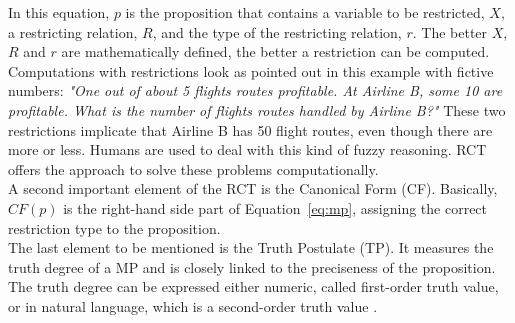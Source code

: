 \documentclass[conference]{IEEEtran}
\begin{document}
In this equation, \begin{math} p \end{math} is the proposition that contains a variable to be restricted, \begin{math} X \end{math}, a restricting relation, \begin{math} R \end{math}, and the type of the restricting relation, \begin{math} r \end{math}. The better \begin{math} X \end{math}, \begin{math} R \end{math} and \begin{math} r \end{math} are mathematically defined, the better a restriction can be computed. Computations with restrictions look as pointed out in this example with fictive numbers:\emph{ "One out of about 5 flights routes profitable. At Airline B, some 10 are profitable. What is the number of flights routes handled by Airline B?"} These two restrictions implicate that Airline B has 50 flight routes, even though there are more or less. Humans are used to deal with this kind of fuzzy reasoning. RCT offers the approach to solve these problems computationally.\\
A second important element of the RCT is the Canonical Form (CF). Basically, \begin{math} CF(p) \end{math} is the right-hand side part of Equation~\ref{eq:mp}, assigning the correct restriction type to the proposition.\\
The last element to be mentioned is the Truth Postulate (TP). It measures the truth degree of a MP and is closely linked to the preciseness of the proposition. The truth degree can be expressed either numeric, called first-order truth value, or in natural language, which is a second-order truth value \cite{zadeh2013}.
\end{document}
